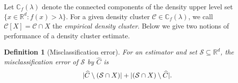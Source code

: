 \documentclass{article}
\DeclarePairedDelimiter\abs{\lvert}{\rvert}
\newcommand{\Reals}{\mathbb{R}}
\newcommand{\Rd}{\Reals^d}
\newcommand{\1}{\mathbf{1}}
\newcommand{\Xbf}{X}             %
\newcommand{\Cbb}{\mathbb{C}}
\newcommand{\Cset}{\mathcal{C}}
\newcommand{\Cest}{\widehat{C}}
\theoremstyle{aldenthm}
\newtheorem{definition}{Definition}
\theoremstyle{aldenrmrk}
\begin{document}




Let $\Cbb_f(\lambda)$ denote the connected components of the density upper level
set $\{x \in \Rd: f(x) > \lambda\}$.  For a given density cluster $\Cset \in
\Cbb_f(\lambda)$, we call $\Cset[\Xbf] = \Cset \cap \Xbf$ the \emph{empirical
	density cluster}. Below we give two notions of performance of a density cluster estimate. 

\begin{definition}[Misclassification error]
	\label{def: misclassification_rate}
	For an estimator \smash{$\Cest \subseteq \Xbf$} and set
	$\mathcal{S} \subseteq \Reals^d$, the \emph{misclassification error} of $\mathcal{S}$ by $\Cest$ is
	\begin{equation}
	\label{eqn: misclassification_rate}
	\abs{\Cest \setminus (\mathcal{S} \cap \Xbf)} + \abs{(\mathcal{S} \cap \Xbf) \setminus \Cest}.
	\end{equation}
\end{definition}    
\end{document}
